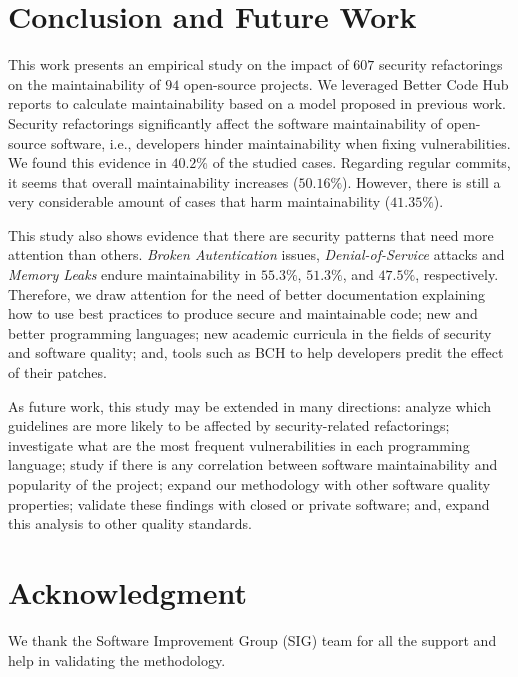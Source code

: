 \documentclass[10pt,conference]{IEEEtran}
\begin{document}
\section{Conclusion and Future Work}\label{sec:conclusions}

This work presents an empirical study on the impact of $607$ security
refactorings on the maintainability of $94$ open-source projects. We leveraged
Better Code Hub reports to calculate maintainability
based on a model proposed in previous work. Security refactorings significantly
affect the software maintainability of open-source software, i.e., developers
hinder maintainability when fixing vulnerabilities. We found this evidence in
$40.2\%$ of the studied cases. Regarding regular commits, it seems that overall
maintainability increases ($50.16\%$). However, there is still a very
considerable amount of cases that harm maintainability ($41.35\%$).

This study also shows evidence that there are security patterns that need more
attention than others. \emph{Broken Autentication} issues,
\emph{Denial-of-Service} attacks and \emph{Memory Leaks} endure maintainability
in $55.3\%$, $51.3\%$, and $47.5\%$, respectively. Therefore, we draw attention
for the need of better documentation explaining how to use best practices to
produce secure and maintainable code; new and better programming languages; new
academic curricula in the fields of security and software quality; and, tools
such as BCH to help developers predit the effect of their patches.

As future work, this study may be extended in many directions: analyze which
guidelines are more likely to be affected by security-related refactorings;
investigate what are the most frequent vulnerabilities in each programming language;
study if there is any correlation between software
maintainability and popularity of the project; expand our methodology with other
software quality properties; validate these findings with closed or private
software; and, expand this analysis to other quality standards.



\section*{Acknowledgment}\label{sec:ack}

\noindent
We thank the Software Improvement Group (SIG) team for all the support and
help in validating the methodology.

\balance

{
 
  
}
\end{document}

